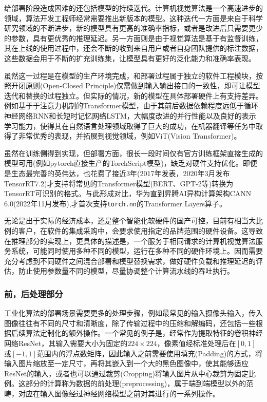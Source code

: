 \documentclass[master]{shtthesis}
\begin{document}
给部署阶段造成困难的还包括模型的持续迭代。计算机视觉算法是一个高速进步的领域，算法开发工程师经常需要推出新版本的模型。这种迭代一方面是来自于科学研究领域的不断进步，新的模型具有更高的准确率指标，或者是改进后只需要更少的参数，具有更优秀的推理延迟。另一方面则是由于视觉算法是基于有监督训练，其在上线的使用过程中，还会不断的收到来自用户或者自身团队提供的标注数据，这些数据会用于不断的扩充训练集，让模型具有更好的泛化能力和准确率表现。

虽然这一过程是在模型的生产环境完成，和部署过程属于独立的软件工程模块，按照开闭原则(Open-Closed Principle)仅需做到输入输出接口的一致性，即可让模型迭代和替换的过程独立。但实际的情况，新的模型在具体部署硬件上有支持差异。例如基于于注意力机制的Transformer\cite{vaswani2017attention}模型，由于其前后数据依赖程度远低于循环神经网络RNN和长短时记忆网络LSTM，大幅度改进的并行性能以及良好的表示学习能力，使得其在自然语言处理领域取得了巨大的成功，在机器翻译等任务中取得了非常优秀的表现，并拓展到视觉领域，例如ViT(Vision Transformer)\cite{khan2022transformers}。

虽然在训练侧得到实现，但部署方面，很长一段时间仅有官方训练框架直接生成的模型可用(例如pytorch直接生产的TorchScript模型)，缺乏对硬件支持优化。即便是生态最完善的英伟达，也花费了接近3年(2017年发表，2020年3月发布TensorRT7.2)才支持将常见的Transformer模型(BERT、GPT-2等)转换为TensorRT\cite{tensorrt7}可识别的格式。与此形成对比，华为直到昇腾AI异构计算架构CANN 6.0(2022年11月发布)\cite{HuaweiCANN},才首次支持\verb|torch.nn|的Transformer Layers算子。

无论是出于实际的经济成本，还是整个智能化软硬件的国产可控，目前有相当大比例的客户，在软件的集成采购中，会要求使用指定的品牌范围的硬件设备。这导致在推理部分的实现上，更具体的描述是，一个服务于相同请求的计算机视觉算法服务系统，可能同时使用多种不同的模型，运行在多种不同的硬件环境上。因而需要充分考虑到不同硬件之间混合部署和模型替换需求，做好硬件负载和推理延迟的评估，防止使用参数量不同的模型，尽量协调整个计算流水线的吞吐执行。

\subsubsection{前，后处理部分}\label{前，后处理部分}
工业化算法的部署场景需要更多的处理步骤，例如最常见的输入摄像头输入，传入图像往往有不同的尺寸和清晰度，除了传输过程中的压缩和解编码，还包括一些根据后续算法定制化的额外操作。一个常见的例子是，经常作为提取特征的卷积神经网络ResNet，其输入需要大小为固定的$224\times224$，像素值经标准处理后在$[0, 1]$或$[-1, 1]$范围内的浮点数矩阵，因此输入之前需要使用填充(Padding)的方式，将输入图片缩放至一定尺寸，再将其嵌入到一个大的黑色图像中，使其能够适应ResNet的输入，或者也可以通过裁剪(Cropping)将输入图片从中心裁剪为固定比例。这部分的计算称为数据的前处理(preprocessing)，属于端到端模型以外的范畴，对应在输入图像经过神经网络模型之前对其进行的一系列操作。
\end{document}
